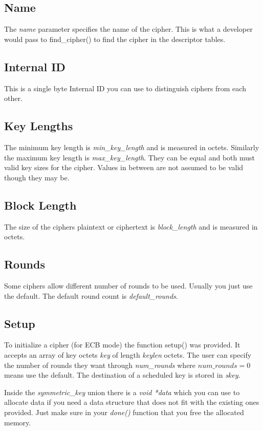 \documentclass[synpaper]{book}
\begin{document}
\subsection{Name}
The \textit{name} parameter specifies the name of the cipher.  This is what a developer would pass to find\_cipher() to find the cipher in the descriptor
tables.

\subsection{Internal ID}
This is a single byte Internal ID you can use to distinguish ciphers from each other.

\subsection{Key Lengths}
The minimum key length is \textit{min\_key\_length} and is measured in octets.  Similarly the maximum key length is \textit{max\_key\_length}.  They can be equal
and both must valid key sizes for the cipher.  Values in between are not assumed to be valid though they may be.

\subsection{Block Length}
The size of the ciphers plaintext or ciphertext is \textit{block\_length} and is measured in octets.

\subsection{Rounds}
Some ciphers allow different number of rounds to be used.  Usually you just use the default.  The default round count is \textit{default\_rounds}.

\subsection{Setup}
To initialize a cipher (for ECB mode) the function setup() was provided.  It accepts an array of key octets \textit{key} of length \textit{keylen} octets.  The user
can specify the number of rounds they want through \textit{num\_rounds} where $num\_rounds = 0$ means use the default.  The destination of a scheduled key is stored
in \textit{skey}.

Inside the \textit{symmetric\_key} union there is a \textit{void *data} which you can use to allocate data if you need a data structure that does not fit with the existing
ones provided.  Just make sure in your \textit{done()} function that you free the allocated memory.
\end{document}
